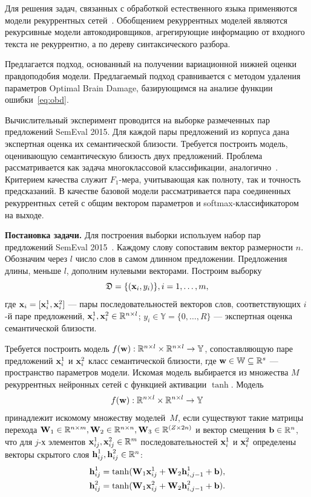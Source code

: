 Для решения задач, связанных с обработкой естественного языка применяются модели рекуррентных сетей~\cite{siamese}. Обобщением рекуррентных моделей являются рекурсивные модели автокодировщиков, агрегирующие информацию от  входного текста не рекуррентно, а по дереву синтаксического разбора.

Предлагается подход, основанный на получении вариационной нижней оценки правдоподобия модели. Предлагаемый подход сравнивается с методом удаления параметров Optimal Brain Damage, базирующимся на анализе функции ошибки~\eqref{eq:obd}. 

Вычислительный эксперимент проводится на выборке размеченных пар предложений SemEval 2015. Для каждой пары предложений из корпуса дана экспертная оценка их семантической близости. Требуется построить модель, оценивающую семантическую близость двух предложений. Проблема рассматривается как задача многоклассовой классификации, аналогично~\cite{sanborn}. Критерием качества служит $F_1$-мера, учитывающая как полноту, так и точность предсказаний.
В качестве базовой модели рассматривается пара соединенных рекуррентных сетей с общим вектором параметров и softmax-классификатором на выходе.

\textbf{Постановка задачи. }
Для построения выборки используем набор пар предложений SemEval 2015~\cite{semeval2015}.
Каждому слову сопоставим вектор размерности $n$.
Обозначим через $l$ число слов в самом длинном предложении. Предложения длины, меньше $l$, дополним нулевыми векторами. 
Построим выборку
$$ {\mathfrak{D}} = \{({\textbf{x}}_i,y_i)\}, i = 1,\dots,m,$$
где ${\textbf{x}}_i = [{\textbf{x}}_i^1,{\textbf{x}}_i^2]$ --- пары последовательностей векторов слов, соответствующих $i$-й паре предложений, ${\textbf{x}}_i^1, {\textbf{x}}_i^2 \in \mathbb{R}^{n\times l}$;
$y_i \in \mathbb{Y} = \{0,\dots,R\}$ --- экспертная оценка семантической близости. 

Требуется построить модель $f({\textbf{w}}): \mathbb{R}^{n\times l} \times \mathbb{R}^{n\times l} \to \mathbb{Y}$, сопоставляющую паре предложений ${\textbf{x}}_i^1$ и ${\textbf{x}}_i^2$ класс семантической близости, где ${\textbf{w}} \in {\mathbb{W}}\subseteq\mathbb{R}^s$ --- пространство параметров модели.
Искомая модель выбирается из множества $M$ рекуррентных нейронных сетей с функцией активации $\tanh$. Модель 
\[
f({\textbf{w}}): \mathbb{R}^{n\times l} \times \mathbb{R}^{n\times l} \to \mathbb{Y}
\]
принадлежит искомому множеству моделей~$M$, если существуют такие матрицы перехода $\mathbf{W}_1\in \mathbb{R}^{n\times m}, \mathbf{W}_2\in \mathbb{R}^{n\times n}, \mathbf{W}_3\in \mathbb{R}^{(Z \times 2n)}$ и вектор смещения ${\mathbf{b}} \in \mathbb{R}^{n}$, что для $j$-х элементов ${\textbf{x}}_{ij}^1, {\textbf{x}}_{ij}^2 \in \mathbb{R}^m$ последовательностей ${\textbf{x}}_i^1$ и ${\textbf{x}}_i^2$ определены векторы скрытого слоя ${\textbf{h}}_{ij}^1, {\textbf{h}}_{ij}^2 \in \mathbb{R}^{n}$:
\begin{gather}
{\textbf{h}}_{ij}^1 = \tanh(\mathbf{W}_1 {\textbf{x}}_{ij}^1 + \mathbf{W}_2 {\textbf{h}}_{i,j-1}^1 + {\mathbf{b}}),\\
{\textbf{h}}_{ij}^2 = \tanh(\mathbf{W}_1 {\textbf{x}}_{ij}^2 + \mathbf{W}_2 {\textbf{h}}_{i,j-1}^2 + {\mathbf{b}}).
\end{gather}

